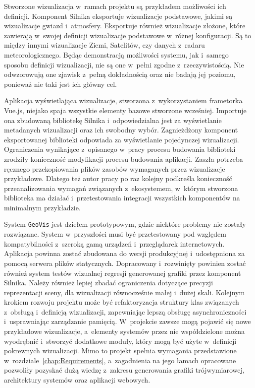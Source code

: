 Stworzone wizualizacja w~ramach projektu są przykładem możliwości ich definicji. Komponent Silnika eksportuje wizualizacje podstawowe, jakimi są wizualizacje gwiazd i~atmosfery. Eksportuje również wizualizacje złożone, które zawierają w~swojej definicji wizualizacje podstawowe w~różnej konfiguracji. Są to między innymi wizualizacje Ziemi, Satelitów, czy danych z~radaru meteorologicznego. Będąc demonstracją możliwości systemu, jak i~samego sposobu definicji wizualizacji, nie są one w~pełni zgodne z~rzeczywistością. Nie odwzorowują one zjawisk z~pełną dokładnością oraz nie badają jej poziomu, ponieważ nie taki jest ich główny cel.

Aplikacja wyświetlająca wizualizacje, stworzona z~wykorzystaniem frametorka Vue.js, niejako spaja wszystkie elementy bazowe stworzone wcześniej. Importuje ona zbudowaną bibliotekę Silnika i~odpowiedzialna jest za wyświetlanie metadanych wizualizacji oraz ich swobodny wybór. Zagnieżdżony komponent eksportowanej biblioteki odpowiada za wyświetlanie pojedynczej wizualizacji. Ograniczenia wynikające z~opisanego w~pracy procesu budowania biblioteki zrodziły konieczność modyfikacji procesu budowania aplikacji. Zaszła potrzeba ręcznego przekopiowania plików zasobów wymaganych przez wizualizacje przykładowe. Dlatego też autor pracy po raz kolejny podkreśla konieczność przeanalizowania wymagań związanych z~ekosystemem, w~którym stworzona biblioteka ma działać i~przetestowania integracji wszystkich komponentów na minimalnym przykładzie.

System \texttt{GeoVis} jest dziełem prototypowym, gdzie niektóre problemy nie zostały rozwiązane. System w~przyszłości musi być przetestowany pod względem kompatybilności z~szeroką gamą urządzeń i~przeglądarek internetowych. Aplikacja powinna zostać zbudowana do wersji produkcyjnej i~udostępniona za pomocą serwera plików statycznych. Dopracowany i~rozwinięty powinien zostać również system testów wizualnej regresji generowanej grafiki przez komponent Silnika. Należy również lepiej zbadać ograniczenia dotyczące precyzji reprezentacji sceny, dla wizualizacji równocześnie małej i~dużej skali. Kolejnym krokiem rozwoju projektu może być refaktoryzacja struktury klas związanych z~obsługą i~definicją wizualizacji, zapewniając lepszą obsługę asynchroniczności i~usprawniając zarządzanie pamięcią. W~projekcie zawsze mogą pojawić się nowe przykładowe wizualizacje, a~elementy systemów przez nie współdzielone można wyodrębnić i~stworzyć dodatkowe moduły, który mogą być użyte w~definicji pokrewnych wizualizacji. Mimo to projekt spełnia wymagania przedstawione w~rozdziale~\ref{chap:Requirements}, a~zagadnienia na jego łamach opracowane pozwoliły pozyskać dużą wiedzę z~zakresu generowania grafiki trójwymiarowej, architektury systemów oraz aplikacji webowych.

